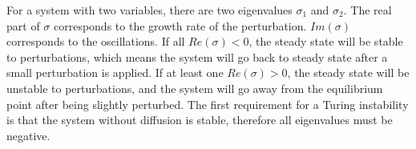 For a system with two variables, there are two eigenvalues $\sigma_{1}$ and $\sigma_{2}$.
The real part of $\sigma$ corresponds to the growth rate of the perturbation.
$Im(\sigma)$ corresponds to the oscillations.
If all $Re(\sigma) < 0 $, the steady state will be stable to perturbations, which means the system will go back to steady state after a small perturbation is applied.
If at least one $Re(\sigma) > 0 $, the steady state will be unstable to perturbations, and the system will go away from the equilibrium point after being slightly perturbed.
The first requirement for a Turing instability is that the system without diffusion is stable, therefore all eigenvalues must be negative.
%
%
%
%
%
%
%
%
